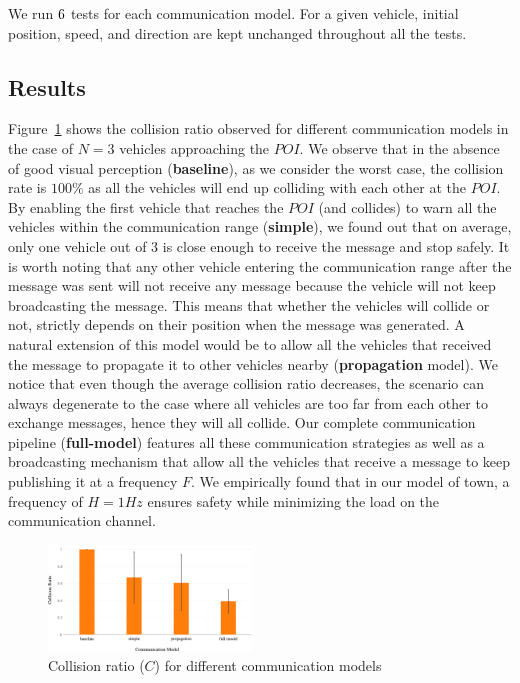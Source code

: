 We run $\num_test_per_scenario$ tests for each communication model. For a given vehicle, initial position, 
speed, and direction are kept unchanged throughout all the tests.

\subsection{Results}

Figure~\ref{fig:collision_ratio} shows the collision ratio observed for different communication models in the
case of $N=3$ vehicles approaching the $POI$. We observe that in the absence of good visual perception
(\textbf{baseline}), as we consider the worst case, the collision rate is $100\%$ as all the vehicles will end up 
colliding with each other at the $POI$. By enabling the first vehicle that reaches the $POI$ (and collides) to
warn all the vehicles within the communication range (\textbf{simple}), we found out that on 
average, only one vehicle out of $3$ is close enough to receive the message and stop safely. It is worth noting
that any other vehicle entering the communication range after the message was sent will not receive any message
because the vehicle will not keep broadcasting the message. This means that whether the vehicles will collide or 
not, strictly depends on their position when the message was generated. A natural extension of this model
would be to allow all the vehicles that received the message to propagate it to other vehicles nearby 
(\textbf{propagation} model). We notice that even though the average collision ratio decreases,
the scenario can always degenerate to the case where all vehicles are too far from each other to exchange 
messages, hence they will all collide. 
Our complete communication pipeline (\textbf{full-model}) features all these communication strategies as well
as a broadcasting mechanism that allow all the vehicles that receive a message to keep publishing it at a frequency 
$F$. We empirically found that in our model of town, a frequency of $H=1Hz$ ensures safety while minimizing 
the load on the communication channel.

\begin{figure}[t]
    \centering
    \includegraphics[width=0.48\textwidth, height=0.22\textwidth]{figures/collision_ratio.pdf}
    \caption{Collision ratio ($C$) for different communication models \label{fig:collision_ratio}}
\end{figure}

